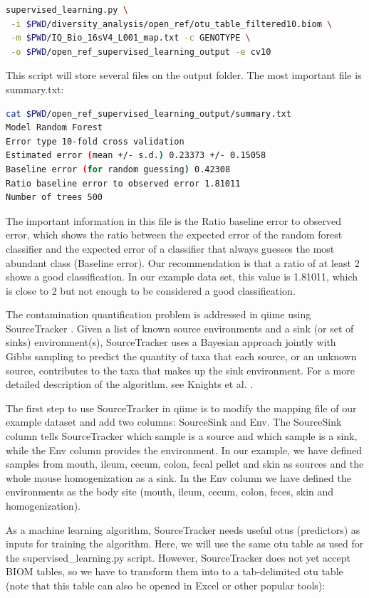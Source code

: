\begin{lstlisting}[language=bash]
supervised_learning.py \
 -i $PWD/diversity_analysis/open_ref/otu_table_filtered10.biom \
 -m $PWD/IQ_Bio_16sV4_L001_map.txt -c GENOTYPE \
 -o $PWD/open_ref_supervised_learning_output -e cv10
\end{lstlisting}

This script will store several files on the output folder. The most important file is summary.txt:

\begin{lstlisting}[language=bash]
cat $PWD/open_ref_supervised_learning_output/summary.txt
Model Random Forest
Error type 10-fold cross validation
Estimated error (mean +/- s.d.) 0.23373 +/- 0.15058
Baseline error (for random guessing) 0.42308
Ratio baseline error to observed error 1.81011
Number of trees 500
\end{lstlisting}

The important information in this file is the Ratio baseline error to observed error, which shows the
ratio between the expected error of the random forest classifier and the expected error of a classifier
that always guesses the most abundant class (Baseline error). Our recommendation is that a ratio of at
least 2 shows a good classification. In our example data set, this value is 1.81011, which is close to 2
but not enough to be considered a good classification.

The contamination quantification problem is addressed in \gls{qiime} using SourceTracker \cite{Knights2011}. Given a
list of known source environments and a sink (or set of sinks) environment(s), SourceTracker uses a Bayesian
approach jointly with Gibbs sampling to predict the quantity of taxa that each source, or an unknown source,
contributes to the taxa that makes up the sink environment. For a more detailed description of the algorithm,
see Knights et al. \cite{Knights2011}.

The first step to use SourceTracker in \gls{qiime} is to modify the mapping file of our example dataset and add two
columns: SourceSink and Env. The SourceSink column tells SourceTracker which sample is a source and which
sample is a sink, while the Env column provides the environment. In our example, we have defined samples from
mouth, ileum, cecum, colon, fecal pellet and skin as sources and the whole mouse homogenization as a sink. In
the Env column we have defined the environments as the body site (mouth, ileum, cecum, colon, feces, skin and homogenization).

As a machine learning algorithm, SourceTracker needs useful \gls{otu}s (predictors) as inputs for training the algorithm.
Here, we will use the same \gls{otu} table as used for the supervised\_learning.py script. However, SourceTracker does not
yet accept BIOM tables, so we have to transform them into to a tab-delimited \gls{otu} table (note that this table can also
be opened in Excel or other popular tools):

